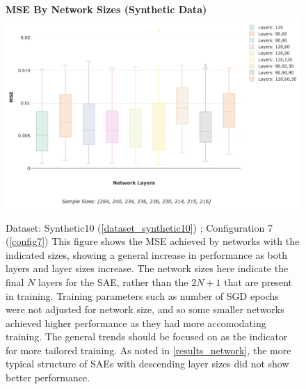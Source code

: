 \documentclass[a4paper,11pt,oneside]{article}
\theoremstyle{plain}
\theoremstyle{definition}
\begin{document}
	\begin{figure}[H]
		\centering 
		\textbf{MSE By Network Sizes (Synthetic Data)}
		\includegraphics[scale=0.25]{images/results/network/synth_mse_box.png} 
		\caption[MSE By Network Sizes (Synthetic Data)]{Dataset: Synthetic10 (\ref{dataset_synthetic10}) ; Configuration 7 (\ref{config7})
			\newline This figure shows the MSE achieved by networks with the indicated sizes, showing a general increase in performance as both layers and layer sizes increase. The network sizes here indicate the final $N$ layers for the SAE, rather than the $2N + 1$ that are present in training. Training parameters such as number of SGD epochs were not adjusted for network size, and so some smaller networks achieved higher performance as they had more accomodating training. The general trends should be focused on as the indicator for more tailored training. As noted in \ref{results_network}, the more typical structure of SAEs with descending layer sizes did not show better performance.}
		\label{figure-synth_mse_box}
	\end{figure}
	
\end{document}
